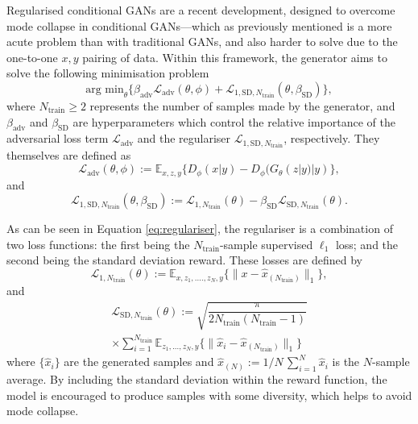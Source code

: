 \documentclass[fleqn,usenatbib]{mnras}
\newcommand{\Lagr}{\mathcal{L}}
\begin{document}
Regularised conditional GANs \citep{bendel2024regularized} are a recent development, designed to overcome mode collapse in conditional GANs---which as previously mentioned is a more acute problem than with traditional GANs, and also harder to solve due to the one-to-one ${x, y}$ pairing of data. Within this framework, the generator aims to solve the following minimisation problem
\begin{equation}
    \text{arg min}_\theta \{ \beta_{\text{adv}}\Lagr_{\text{adv}}(\theta, \phi) + \Lagr_{1, \text{SD}, N_{\text{train}}}(\theta, \beta_{\text{SD}})\},
\end{equation}
where $N_{\text{train}} \geq 2$ represents the number of samples made by the generator, and $\beta_{\text{adv}}$ and $\beta_{\text{SD}}$ are hyperparameters which control the relative importance of the adversarial loss term $\Lagr_{\text{adv}}$ and the regulariser $\Lagr_{1, \text{SD}, N_{\text{train}}}$, respectively. They themselves are defined as
\begin{equation}
	\Lagr_{\text{adv}}(\theta, \phi) := \mathbb{E}_{x,z,y} \{ D_\phi (x|y) - D_\phi (G_\theta (z|y)|y)\},
\end{equation}
and
\begin{equation}
    \Lagr_{1, \text{SD}, N_{\text{train}}}(\theta, \beta_{\text{SD}}) := \Lagr_{1, N_{\text{train}}}(\theta) - \beta_{\text{SD}}\Lagr_{\text{SD}, N_{\text{train}}}(\theta).
	\label{eq:regulariser}
\end{equation}

As can be seen in Equation \eqref{eq:regulariser}, the regulariser is a combination of two loss functions: 
the first being the $N_{\text{train}}$-sample supervised $\ell_1$ loss; and the second being the standard 
deviation reward. These losses are defined by
\begin{equation}
    \Lagr_{1, N_{\text{train}}}(\theta) := \mathbb{E}_{x, z_1, ...., z_N, y}\{ \lVert x - \hat{x}_{(N_{\text{train}})}\rVert_1\},
\end{equation}
and 
\begin{multline}
	\Lagr_{\text{SD}, N_{\text{train}}}(\theta) := \sqrt{\dfrac{\pi}{2 N_{\text{train}}(N_{\text{train}} - 1)}} \\
	\times \sum_{i=1}^{N_{\text{train}}}\mathbb{E}_{z_1,...,z_N,y} \{ \lVert\hat{x}_{i} - \hat{x}_{(N_{\text{train}})}\rVert_1\}
\end{multline}
where $\{ \hat{x}_{i}\}$ are the generated samples and 
$\hat{x}_{(N)} := 1/N \,\sum_{i=1}^{N} \hat{x}_{i}$ is the $N$-sample average. By including the standard deviation within the reward function, the model is encouraged to produce samples with some diversity, which helps to avoid mode collapse.
\end{document}
